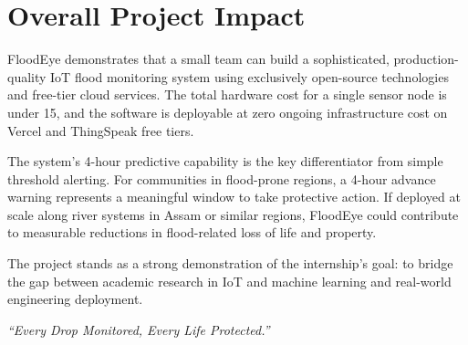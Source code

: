 \section{Overall Project Impact}

FloodEye demonstrates that a small team can build a sophisticated, production-quality IoT flood monitoring system using exclusively open-source technologies and free-tier cloud services. The total hardware cost for a single sensor node is under \texteuro{}15, and the software is deployable at zero ongoing infrastructure cost on Vercel and ThingSpeak free tiers.

The system's 4-hour predictive capability is the key differentiator from simple threshold alerting. For communities in flood-prone regions, a 4-hour advance warning represents a meaningful window to take protective action. If deployed at scale along river systems in Assam or similar regions, FloodEye could contribute to measurable reductions in flood-related loss of life and property.

The project stands as a strong demonstration of the internship's goal: to bridge the gap between academic research in IoT and machine learning and real-world engineering deployment.

\vspace{1cm}
\begin{center}
\textcolor{FloodBlue}{\textit{``Every Drop Monitored, Every Life Protected.''}}
\end{center}

